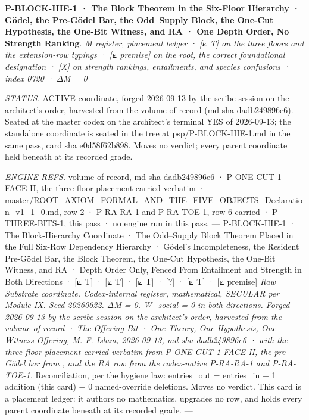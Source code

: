 \documentclass[10pt,twocolumn]{article}
\begin{document}
\textbf{P-BLOCK-HIE-1 · The Block Theorem in the Six-Floor Hierarchy ·
Gödel, the Pre-Gödel Bar, the Odd--Supply Block, the One-Cut Hypothesis,
the One-Bit Witness, and RA · One Depth Order, No Strength Ranking}.
\emph{M register, placement ledger · {[}⟀ T{]} on the three floors and
the extension-row typings · {[}⟀ premise{]} on the root, the correct
foundational designation · {[}X{]} on strength rankings, entailments,
and species confusions · index 0720 · ΔM = 0}

\emph{STATUS.} ACTIVE coordinate, forged 2026-09-13 by the scribe
session on the architect's order, harvested from the volume of record
(md sha dadb249896e6). Seated at the master codex on the architect's
terminal YES of 2026-09-13; the standalone coordinate is seated in the
tree at psp/P-BLOCK-HIE-1.md in the same pass, card sha e0d58f62b898.
Moves no verdict; every parent coordinate held beneath at its recorded
grade.

\emph{ENGINE REFS.} volume of record, md sha dadb249896e6 · P-ONE-CUT-1
FACE II, the three-floor placement carried verbatim ·
master/ROOT\_AXIOM\_FORMAL\_AND\_THE\_FIVE\_OBJECTS\_Declaration\_v1\_1\_0.md,
row 2 · P-RA-RA-1 and P-RA-TOE-1, row 6 carried · P-THREE-BITS-1, this
pass · no engine run in this pass. --- P-BLOCK-HIE-1 · The
Block-Hierarchy Coordinate · The Odd--Supply Block Theorem Placed in the
Full Six-Row Dependency Hierarchy · Gödel's Incompleteness, the Resident
Pre-Gödel Bar, the Block Theorem, the One-Cut Hypothesis, the One-Bit
Witness, and RA · Depth Order Only, Fenced From Entailment and Strength
in Both Directions · {[}⟀ T{]} · {[}⟀ T{]} · {[}⟀ T{]} · {[}?{]} · {[}⟀
T{]} · {[}⟀ premise{]} \emph{Raw Substrate coordinate. Codex-internal
register, mathematical, SECULAR per Module IX. Seed 20260622. ΔM = 0.
W\_social = 0 in both directions. Forged 2026-09-13 by the scribe
session on the architect's order, harvested from the volume of record ·
The Offering Bit · One Theory, One Hypothesis, One Witness Offering, M.
F. Islam, 2026-09-13, md sha dadb249896e6 · with the three-floor
placement carried verbatim from P-ONE-CUT-1 FACE II, the pre-Gödel bar
from
\texttt{},
and the RA row from the codex-native P-RA-RA-1 and P-RA-TOE-1.}
Reconciliation, per the hygiene law: entries\_out = entries\_in + 1
addition (this card) − 0 named-override deletions. Moves no verdict.
This card is a placement ledger: it authors no mathematics, upgrades no
row, and holds every parent coordinate beneath at its recorded grade.
---
\end{document}

